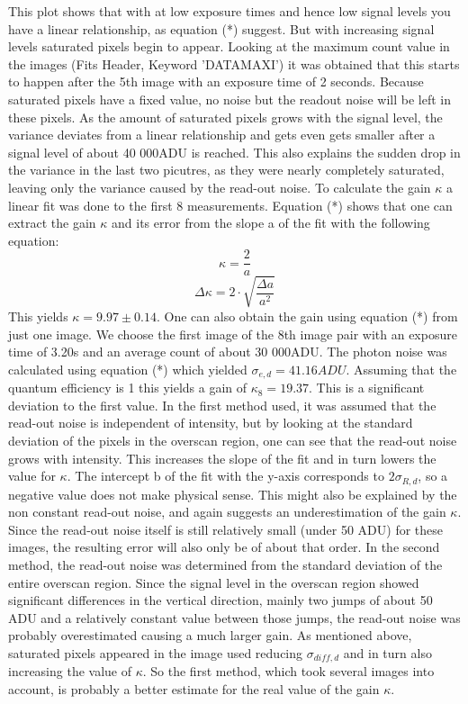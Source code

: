 \documentclass[12pt]{article}
\begin{document}
This plot shows that with at low exposure times and hence low signal levels you  have a linear relationship, as equation (*) suggest. But with increasing signal levels saturated pixels begin to appear. Looking at the maximum count value in the images (Fits Header, Keyword 'DATAMAXI') it was obtained that this starts to happen after the 5th image with an exposure time of 2 seconds. Because saturated pixels have a fixed value, no noise but the readout noise will be left in these pixels. As the amount of saturated pixels grows with the signal level, the variance deviates from a linear relationship and gets even gets smaller after a signal level of about 40 000ADU is reached. This also explains the sudden drop in the variance in the last two picutres, as they were nearly completely saturated, leaving only the variance caused by the read-out noise. To calculate the gain $\kappa$ a linear fit was done to the first 8 measurements. Equation (*) shows that one can extract the gain $\kappa$ and its error from the slope a of the fit with the following equation: 
\begin{equation}
\kappa=\frac{2}{a} 
\end{equation}
\begin{equation}
\Delta\kappa=2\cdot \sqrt{\frac{\Delta a}{a^2}}
\end{equation}
This yields $\kappa=9.97\pm0.14$. One can also obtain the gain using equation (*) from just one image. We choose the first image of the 8th image pair with an exposure time of 3.20s and an average count of about 30 000ADU. The photon noise was calculated using equation (*) which yielded $\sigma_{e,d}=41.16ADU$. Assuming that the quantum efficiency is 1 this yields a gain of $\kappa_8=19.37$. This is a significant deviation to the  first value. In the first method used, it was assumed that the read-out noise is independent of intensity, but by looking at the standard deviation of the pixels in the overscan region, one can see that the read-out noise grows with intensity. This increases the slope of the fit and in turn lowers the value for $\kappa$. The intercept b of the fit with the y-axis corresponds to $2\sigma_{R,d}$, so a negative value does not make physical sense. This might also be explained by the non constant read-out noise, and again suggests an underestimation of the gain $\kappa$. Since the read-out noise itself is still relatively small (under 50 ADU) for these images, the resulting error will also only be of about that order.  In the second method, the read-out noise was determined from the standard deviation of the entire overscan region. Since the signal level in the overscan region showed significant differences in the vertical direction, mainly two jumps of about 50 ADU and a relatively constant value between those jumps, the read-out noise was probably overestimated causing a much larger gain. As mentioned above, saturated pixels appeared in the image used reducing $\sigma_{diff,d}$ and in turn also increasing the value of $\kappa$.  So the first method, which took several images into account, is probably a better estimate for the real value of the gain $\kappa$.
\end{document}
